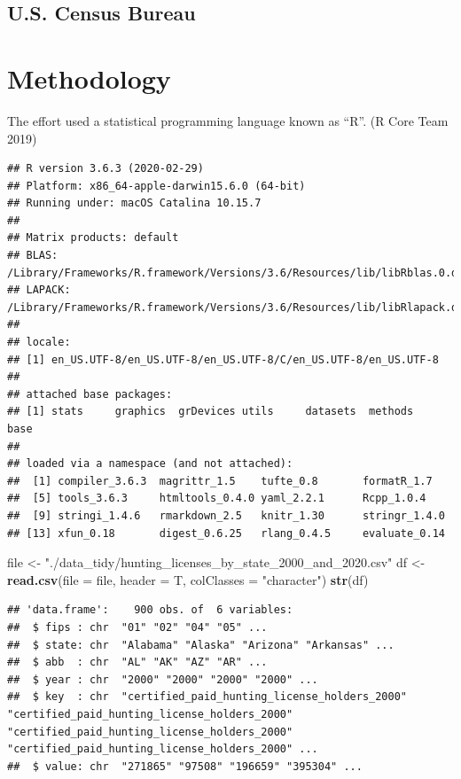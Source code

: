 \documentclass[]{tufte-handout}
\newenvironment{Shaded}{}{}
\newcommand{\DataTypeTok}[1]{\textcolor[rgb]{0.56,0.13,0.00}{#1}}
\newcommand{\KeywordTok}[1]{\textcolor[rgb]{0.00,0.44,0.13}{\textbf{#1}}}
\newcommand{\NormalTok}[1]{#1}
\newcommand{\StringTok}[1]{\textcolor[rgb]{0.25,0.44,0.63}{#1}}
\begin{document}
\hypertarget{u.s.-census-bureau}{%
\subsection{U.S. Census Bureau}\label{u.s.-census-bureau}}

\hypertarget{methodology}{%
\section{Methodology}\label{methodology}}

The effort used a statistical programming language known as ``R''. (R
Core Team 2019)

\begin{verbatim}
## R version 3.6.3 (2020-02-29)
## Platform: x86_64-apple-darwin15.6.0 (64-bit)
## Running under: macOS Catalina 10.15.7
## 
## Matrix products: default
## BLAS:   /Library/Frameworks/R.framework/Versions/3.6/Resources/lib/libRblas.0.dylib
## LAPACK: /Library/Frameworks/R.framework/Versions/3.6/Resources/lib/libRlapack.dylib
## 
## locale:
## [1] en_US.UTF-8/en_US.UTF-8/en_US.UTF-8/C/en_US.UTF-8/en_US.UTF-8
## 
## attached base packages:
## [1] stats     graphics  grDevices utils     datasets  methods   base     
## 
## loaded via a namespace (and not attached):
##  [1] compiler_3.6.3  magrittr_1.5    tufte_0.8       formatR_1.7    
##  [5] tools_3.6.3     htmltools_0.4.0 yaml_2.2.1      Rcpp_1.0.4     
##  [9] stringi_1.4.6   rmarkdown_2.5   knitr_1.30      stringr_1.4.0  
## [13] xfun_0.18       digest_0.6.25   rlang_0.4.5     evaluate_0.14
\end{verbatim}

\begin{Shaded}
\begin{Highlighting}[]
\NormalTok{file <-}\StringTok{ "./data_tidy/hunting_licenses_by_state_2000_and_2020.csv"}
\NormalTok{df <-}\StringTok{ }\KeywordTok{read.csv}\NormalTok{(}\DataTypeTok{file =}\NormalTok{ file, }\DataTypeTok{header =}\NormalTok{ T, }\DataTypeTok{colClasses =} \StringTok{"character"}\NormalTok{)}
\KeywordTok{str}\NormalTok{(df)}
\end{Highlighting}
\end{Shaded}

\begin{verbatim}
## 'data.frame':    900 obs. of  6 variables:
##  $ fips : chr  "01" "02" "04" "05" ...
##  $ state: chr  "Alabama" "Alaska" "Arizona" "Arkansas" ...
##  $ abb  : chr  "AL" "AK" "AZ" "AR" ...
##  $ year : chr  "2000" "2000" "2000" "2000" ...
##  $ key  : chr  "certified_paid_hunting_license_holders_2000" "certified_paid_hunting_license_holders_2000" "certified_paid_hunting_license_holders_2000" "certified_paid_hunting_license_holders_2000" ...
##  $ value: chr  "271865" "97508" "196659" "395304" ...
\end{verbatim}
\end{document}
